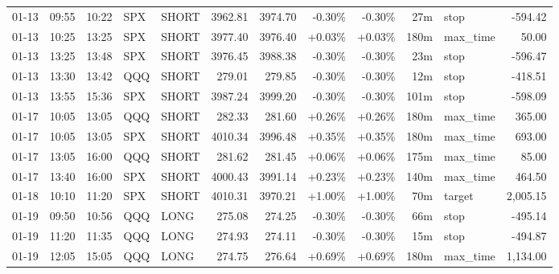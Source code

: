 \documentclass[11pt,a4paper,twoside]{article}
\begin{document}
\begin{center}
\begin{longtable}{>{\color{txtmain}}l l l l l r r r r r >{\color{txtmain}}l r}
01-13 & 09:55 & 10:22 & SPX & SHORT & 3962.81 & 3974.70 & \textcolor{lossred}{-0.30\%} & \textcolor{lossred}{-0.30\%} & 27m & stop & \textcolor{lossred}{-594.42} \\
01-13 & 10:25 & 13:25 & SPX & SHORT & 3977.40 & 3976.40 & \textcolor{wingreen}{+0.03\%} & \textcolor{wingreen}{+0.03\%} & 180m & max\_time & \textcolor{wingreen}{50.00} \\
01-13 & 13:25 & 13:48 & SPX & SHORT & 3976.45 & 3988.38 & \textcolor{lossred}{-0.30\%} & \textcolor{lossred}{-0.30\%} & 23m & stop & \textcolor{lossred}{-596.47} \\
01-13 & 13:30 & 13:42 & QQQ & SHORT & 279.01 & 279.85 & \textcolor{lossred}{-0.30\%} & \textcolor{lossred}{-0.30\%} & 12m & stop & \textcolor{lossred}{-418.51} \\
01-13 & 13:55 & 15:36 & SPX & SHORT & 3987.24 & 3999.20 & \textcolor{lossred}{-0.30\%} & \textcolor{lossred}{-0.30\%} & 101m & stop & \textcolor{lossred}{-598.09} \\
01-17 & 10:05 & 13:05 & QQQ & SHORT & 282.33 & 281.60 & \textcolor{wingreen}{+0.26\%} & \textcolor{wingreen}{+0.26\%} & 180m & max\_time & \textcolor{wingreen}{365.00} \\
01-17 & 10:05 & 13:05 & SPX & SHORT & 4010.34 & 3996.48 & \textcolor{wingreen}{+0.35\%} & \textcolor{wingreen}{+0.35\%} & 180m & max\_time & \textcolor{wingreen}{693.00} \\
01-17 & 13:05 & 16:00 & QQQ & SHORT & 281.62 & 281.45 & \textcolor{wingreen}{+0.06\%} & \textcolor{wingreen}{+0.06\%} & 175m & max\_time & \textcolor{wingreen}{85.00} \\
01-17 & 13:40 & 16:00 & SPX & SHORT & 4000.43 & 3991.14 & \textcolor{wingreen}{+0.23\%} & \textcolor{wingreen}{+0.23\%} & 140m & max\_time & \textcolor{wingreen}{464.50} \\
01-18 & 10:10 & 11:20 & SPX & SHORT & 4010.31 & 3970.21 & \textcolor{wingreen}{+1.00\%} & \textcolor{wingreen}{+1.00\%} & 70m & target & \textcolor{wingreen}{2,005.15} \\
01-19 & 09:50 & 10:56 & QQQ & LONG & 275.08 & 274.25 & \textcolor{lossred}{-0.30\%} & \textcolor{lossred}{-0.30\%} & 66m & stop & \textcolor{lossred}{-495.14} \\
01-19 & 11:20 & 11:35 & QQQ & LONG & 274.93 & 274.11 & \textcolor{lossred}{-0.30\%} & \textcolor{lossred}{-0.30\%} & 15m & stop & \textcolor{lossred}{-494.87} \\
01-19 & 12:05 & 15:05 & QQQ & LONG & 274.75 & 276.64 & \textcolor{wingreen}{+0.69\%} & \textcolor{wingreen}{+0.69\%} & 180m & max\_time & \textcolor{wingreen}{1,134.00} \\

\end{longtable}
\end{center}
\end{document}
